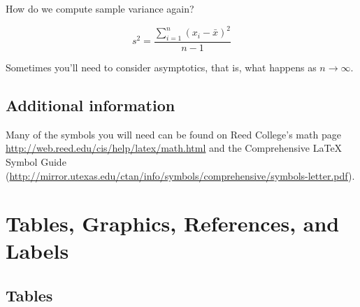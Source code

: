 \documentclass[12pt, twoside]{amherstthesis}
\begin{document}
How do we compute sample variance again?

\[s^2 = \frac{\sum_{i=1}^n (x_i-\bar x)^2}{n-1}\]

Sometimes you'll need to consider asymptotics, that is, what happens as \(n\rightarrow \infty\).

\hypertarget{additional-information}{%
\section{Additional information}\label{additional-information}}

Many of the symbols you will need can be found on Reed College's math page \url{http://web.reed.edu/cis/help/latex/math.html} and the Comprehensive LaTeX Symbol Guide (\url{http://mirror.utexas.edu/ctan/info/symbols/comprehensive/symbols-letter.pdf}).

\hypertarget{ref-labels}{%
\chapter{Tables, Graphics, References, and Labels}\label{ref-labels}}

\hypertarget{tables}{%
\section{Tables}\label{tables}}
\end{document}
